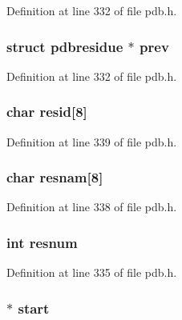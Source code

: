 Definition at line 332 of file pdb.\-h.

\hypertarget{structpdbresidue_a8725af2cbb3db5aa9845a23d397baf58}{
\subsubsection[{prev}]{\setlength{\rightskip}{0pt plus 5cm}struct {\bf pdbresidue} $\ast$ prev}}\label{structpdbresidue_a8725af2cbb3db5aa9845a23d397baf58}


Definition at line 332 of file pdb.\-h.

\hypertarget{structpdbresidue_aeec8f1b013ec1e7156d773d72b3b91fd}{
\subsubsection[{resid}]{\setlength{\rightskip}{0pt plus 5cm}char resid\mbox{[}8\mbox{]}}}\label{structpdbresidue_aeec8f1b013ec1e7156d773d72b3b91fd}


Definition at line 339 of file pdb.\-h.

\hypertarget{structpdbresidue_a6f47476bfe0dd0abc0ade4a21127dfc2}{
\subsubsection[{resnam}]{\setlength{\rightskip}{0pt plus 5cm}char resnam\mbox{[}8\mbox{]}}}\label{structpdbresidue_a6f47476bfe0dd0abc0ade4a21127dfc2}


Definition at line 338 of file pdb.\-h.

\hypertarget{structpdbresidue_a7503a437042b8ae030eefb90decd7ceb}{
\subsubsection[{resnum}]{\setlength{\rightskip}{0pt plus 5cm}int resnum}}\label{structpdbresidue_a7503a437042b8ae030eefb90decd7ceb}


Definition at line 335 of file pdb.\-h.

\hypertarget{structpdbresidue_af9637d86382b94dc2d5afbf24ecc4a34}{
\subsubsection[{start}]{$\ast$ start}}\label{structpdbresidue_af9637d86382b94dc2d5afbf24ecc4a34}


